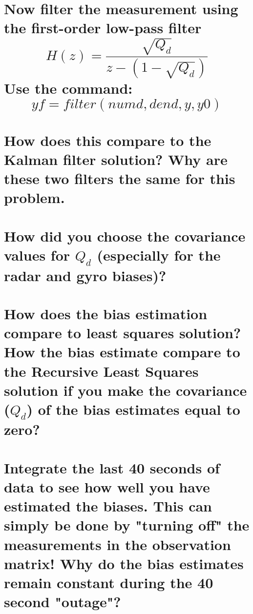 \documentclass[12pt,letterpaper, onecolumn]{exam}
\begin{document}
\begin{questions}
\begin{parts}
        \part{Now filter the measurement using the first-order low-pass filter
            \[H(z)=  \frac{\sqrt{Q_d}}{z - \left(1 - \sqrt{Q_d}\right)} \]
            Use the command:
            \[yf = filter(numd,dend,y,y0)\]}

        \part{How does this compare to the Kalman filter solution? Why are these two filters the same for this problem.}
    \end{parts}
    \clearpage
    \begin{parts}
        \part{How did you choose the covariance values for $Q_d$ (especially for the radar and gyro biases)?}

        \part{How does the bias estimation compare to least squares solution? How the bias estimate compare to the Recursive Least Squares solution if you make the covariance ($Q_d$) of the bias estimates equal to zero?}

        \part{Integrate the last 40 seconds of data to see how well you have estimated the biases. This can simply be done by "turning off" the measurements in the observation matrix! Why do the bias estimates remain constant during the 40 second "outage"?}


\end{parts}
\end{questions}
\end{document}
